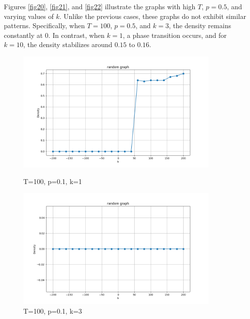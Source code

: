 \documentclass[11pt]{book}
\begin{document}
Figures \eqref{fig20}, \eqref{fig21}, and \eqref{fig22} illustrate the graphs with high $T$, $p=0.5$, and varying values of $k$. Unlike the previous cases, these graphs do not exhibit similar patterns. Specifically, when $T=100$, $p=0.5$, and $k=3$, the density remains constantly at $0$. In contrast, when $k=1$, a phase transition occurs, and for $k=10$, the density stabilizes around $0.15$ to $0.16$.

\begin{figure}
    \centering
    \begin{minipage}{0.45\textwidth}
        \centering
        \includegraphics[width=0.9\textwidth]{rg. T=100, p=0.1, k=1.png} %
        \caption{T=100, p=0.1, k=1}
        \label{fig23}
    \end{minipage}\hfill
    \begin{minipage}{0.45\textwidth}
        \centering
        \includegraphics[width=0.9\textwidth]{rg. T=100,p=0.1,k=3.png} %
        \caption{T=100, p=0.1, k=3}
        \label{fig24}
    \end{minipage}
    \begin{minipage}{0.45\textwidth}

\end{minipage}
\end{figure}
\end{document}
